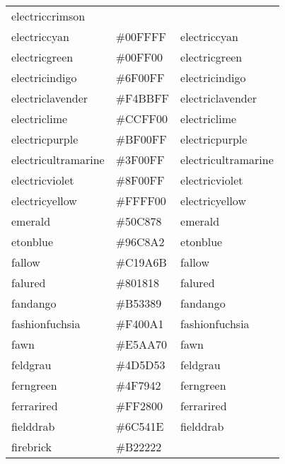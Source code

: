 \documentclass[
]{article}
\begin{document}
\begin{longtable}[]{@{}lll@{}}
\textcolor[rgb]{1.0,0.0,0.25}{electriccrimson       }\tabularnewline
electriccyan & \colorbox[rgb]{0.0,1.0,1.0}{\#00FFFF} &
\textcolor[rgb]{0.0,1.0,1.0}{electriccyan          }\tabularnewline
electricgreen & \colorbox[rgb]{0.0,1.0,0.0}{\#00FF00} &
\textcolor[rgb]{0.0,1.0,0.0}{electricgreen         }\tabularnewline
electricindigo & \colorbox[rgb]{0.44,0.0,1.0}{\#6F00FF} &
\textcolor[rgb]{0.44,0.0,1.0}{electricindigo        }\tabularnewline
electriclavender & \colorbox[rgb]{0.96,0.73,1.0}{\#F4BBFF} &
\textcolor[rgb]{0.96,0.73,1.0}{electriclavender      }\tabularnewline
electriclime & \colorbox[rgb]{0.8,1.0,0.0}{\#CCFF00} &
\textcolor[rgb]{0.8,1.0,0.0}{electriclime          }\tabularnewline
electricpurple & \colorbox[rgb]{0.75,0.0,1.0}{\#BF00FF} &
\textcolor[rgb]{0.75,0.0,1.0}{electricpurple        }\tabularnewline
electricultramarine & \colorbox[rgb]{0.25,0.0,1.0}{\#3F00FF} &
\textcolor[rgb]{0.25,0.0,1.0}{electricultramarine   }\tabularnewline
electricviolet & \colorbox[rgb]{0.56,0.0,1.0}{\#8F00FF} &
\textcolor[rgb]{0.56,0.0,1.0}{electricviolet        }\tabularnewline
electricyellow & \colorbox[rgb]{1.0,1.0,0.0}{\#FFFF00} &
\textcolor[rgb]{1.0,1.0,0.0}{electricyellow        }\tabularnewline
emerald & \colorbox[rgb]{0.31,0.78,0.47}{\#50C878} &
\textcolor[rgb]{0.31,0.78,0.47}{emerald               }\tabularnewline
etonblue & \colorbox[rgb]{0.59,0.78,0.64}{\#96C8A2} &
\textcolor[rgb]{0.59,0.78,0.64}{etonblue              }\tabularnewline
fallow & \colorbox[rgb]{0.76,0.6,0.42}{\#C19A6B} &
\textcolor[rgb]{0.76,0.6,0.42}{fallow                }\tabularnewline
falured & \colorbox[rgb]{0.5,0.09,0.09}{\#801818} &
\textcolor[rgb]{0.5,0.09,0.09}{falured               }\tabularnewline
fandango & \colorbox[rgb]{0.71,0.2,0.54}{\#B53389} &
\textcolor[rgb]{0.71,0.2,0.54}{fandango              }\tabularnewline
fashionfuchsia & \colorbox[rgb]{0.96,0.0,0.63}{\#F400A1} &
\textcolor[rgb]{0.96,0.0,0.63}{fashionfuchsia        }\tabularnewline
fawn & \colorbox[rgb]{0.9,0.67,0.44}{\#E5AA70} &
\textcolor[rgb]{0.9,0.67,0.44}{fawn                  }\tabularnewline
feldgrau & \colorbox[rgb]{0.3,0.36,0.33}{\#4D5D53} &
\textcolor[rgb]{0.3,0.36,0.33}{feldgrau              }\tabularnewline
ferngreen & \colorbox[rgb]{0.31,0.47,0.26}{\#4F7942} &
\textcolor[rgb]{0.31,0.47,0.26}{ferngreen             }\tabularnewline
ferrarired & \colorbox[rgb]{1.0,0.11,0.0}{\#FF2800} &
\textcolor[rgb]{1.0,0.11,0.0}{ferrarired            }\tabularnewline
fielddrab & \colorbox[rgb]{0.42,0.33,0.12}{\#6C541E} &
\textcolor[rgb]{0.42,0.33,0.12}{fielddrab             }\tabularnewline
firebrick & \colorbox[rgb]{0.7,0.13,0.13}{\#B22222} &

\end{longtable}
\end{document}

